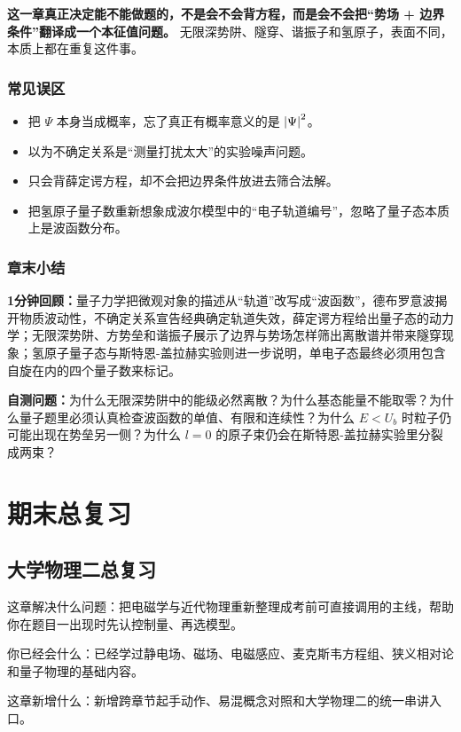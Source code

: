 \documentclass[lang=cn,11pt]{elegantbook}
\newcommand{\chapterroadmap}[3]{%
\begin{introduction}
  \item {\heiti 这章解决什么问题：}#1
  \item {\heiti 你已经会什么：}#2
  \item {\heiti 这章新增什么：}#3
\end{introduction}}
\newcommand{\summaryline}[1]{\par\noindent\textbf{1分钟回顾：}#1\par}
\newcommand{\chapterselfcheck}[1]{\par\noindent\textbf{自测问题：}#1\par}
\begin{document}
\begin{remark}
\textbf{这一章真正决定能不能做题的，不是会不会背方程，而是会不会把“势场 + 边界条件”翻译成一个本征值问题。} 无限深势阱、隧穿、谐振子和氢原子，表面不同，本质上都在重复这件事。
\end{remark}

\section{常见误区}

\begin{itemize}
  \item 把 \(\Psi\) 本身当成概率，忘了真正有概率意义的是 \(\abs{\Psi}^2\)。
  \item 以为不确定关系是“测量打扰太大”的实验噪声问题。
  \item 只会背薛定谔方程，却不会把边界条件放进去筛合法解。
  \item 把氢原子量子数重新想象成波尔模型中的“电子轨道编号”，忽略了量子态本质上是波函数分布。
\end{itemize}

\section{章末小结}

\summaryline{量子力学把微观对象的描述从“轨道”改写成“波函数”，德布罗意波揭开物质波动性，不确定关系宣告经典确定轨道失效，薛定谔方程给出量子态的动力学；无限深势阱、方势垒和谐振子展示了边界与势场怎样筛出离散谱并带来隧穿现象；氢原子量子态与斯特恩-盖拉赫实验则进一步说明，单电子态最终必须用包含自旋在内的四个量子数来标记。}
\chapterselfcheck{为什么无限深势阱中的能级必然离散？为什么基态能量不能取零？为什么量子题里必须认真检查波函数的单值、有限和连续性？为什么 \(E<U_b\) 时粒子仍可能出现在势垒另一侧？为什么 \(l=0\) 的原子束仍会在斯特恩-盖拉赫实验里分裂成两束？}

\part{期末总复习}

\chapter{大学物理二总复习}

\chapterroadmap
{把电磁学与近代物理重新整理成考前可直接调用的主线，帮助你在题目一出现时先认控制量、再选模型。}
{已经学过静电场、磁场、电磁感应、麦克斯韦方程组、狭义相对论和量子物理的基础内容。}
{新增跨章节起手动作、易混概念对照和大学物理二的统一串讲入口。}
\end{document}
